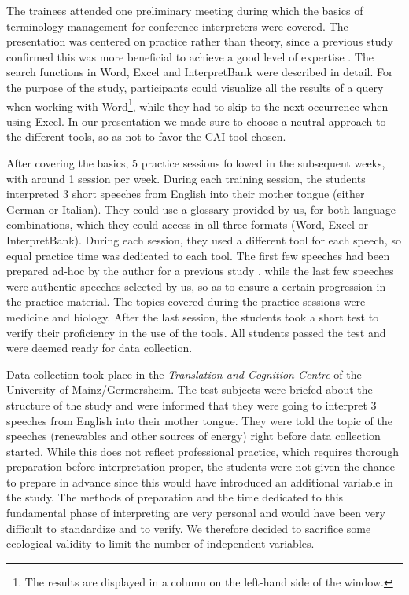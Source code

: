 \documentclass[output=paper]{langsci/langscibook}
\begin{document}
The trainees attended one preliminary meeting during which the basics of terminology management for conference interpreters were covered. The presentation was centered on practice rather than theory, since a previous study confirmed this was more beneficial to achieve a good level of expertise \citep{Prandi2015a, Prandi2015b}. The search functions in Word, Excel and InterpretBank were described in detail. For the purpose of the study, participants could visualize all the results of a query when working with Word\footnote{The results are displayed in a column on the left-hand side of the window.}, while they had to skip to the next occurrence when using Excel. In our presentation we made sure to choose a neutral approach to the different tools, so as not to favor the \textsc{CAI} tool chosen.

After covering the basics, 5 practice sessions followed in the subsequent weeks, with around 1 session per week. During each training session, the students interpreted 3 short speeches from English into their mother tongue (either German or Italian). They could use a glossary provided by us, for both language combinations, which they could access in all three formats (Word, Excel or InterpretBank). During each session, they used a different tool for each speech, so equal practice time was dedicated to each tool. The first few speeches had been prepared ad-hoc by the author for a previous study \citep{Prandi2015a, Prandi2015b}, while the last few speeches were authentic speeches selected by us, so as to ensure a certain progression in the practice material. The topics covered during the practice sessions were medicine and biology. After the last session, the students took a short test to verify their proficiency in the use of the tools. All students passed the test and were deemed ready for data collection.

Data collection took place in the \textit{Translation and Cognition Centre} of the University of Mainz/Germersheim. The test subjects were briefed about the structure of the study and were informed that they were going to interpret 3 speeches from English into their mother tongue. They were told the topic of the speeches (renewables and other sources of energy) right before data collection started. While this does not reflect professional practice, which requires thorough preparation before interpretation proper, the students were not given the chance to prepare in advance since this would have introduced an additional variable in the study. The methods of preparation and the time dedicated to this fundamental phase of interpreting are very personal and would have been very difficult to standardize and to verify. We therefore decided to sacrifice some ecological validity to limit the number of independent variables.
\end{document}
